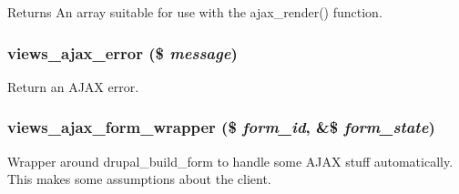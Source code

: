 \begin{DoxyReturn}{Returns}
An array suitable for use with the ajax\_\-render() function. 
\end{DoxyReturn}
\hypertarget{group__ajax_ga59f31023b894be21852b7034f639523f}{
\subsubsection[{views\_\-ajax\_\-error}]{\setlength{\rightskip}{0pt plus 5cm}views\_\-ajax\_\-error (\$ {\em message})}}
\label{group__ajax_ga59f31023b894be21852b7034f639523f}
Return an AJAX error. \hypertarget{group__ajax_ga7eed0d665d7b4c8c8134eb060afbb2be}{
\subsubsection[{views\_\-ajax\_\-form\_\-wrapper}]{\setlength{\rightskip}{0pt plus 5cm}views\_\-ajax\_\-form\_\-wrapper (\$ {\em form\_\-id}, \/  \&\$ {\em form\_\-state})}}
\label{group__ajax_ga7eed0d665d7b4c8c8134eb060afbb2be}
Wrapper around drupal\_\-build\_\-form to handle some AJAX stuff automatically. This makes some assumptions about the client. 